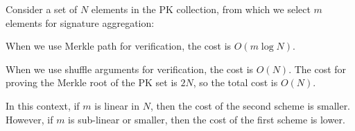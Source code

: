 \documentclass{article}
\begin{document}
Consider a set of \( N \) elements in the PK collection, from which we select \( m \) elements for signature aggregation:

When we use Merkle path for verification, the cost is \( O(m \log N) \).

When we use shuffle arguments for verification, the cost is \( O(N) \). The cost for proving the Merkle root of the PK set is \( 2N \), so the total cost is \( O(N) \).

In this context, if \( m \) is linear in \( N \), then the cost of the second scheme is smaller. However, if \( m \) is sub-linear or smaller, then the cost of the first scheme is lower.






\end{document}

